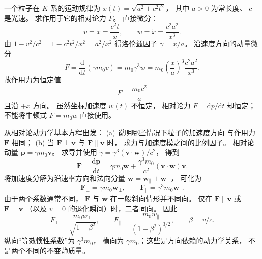 一个粒子在 $K$ 系的运动规律为
$x(t)=\sqrt{a^2+c^2t^2}$，
其中 $a>0$ 为常长度、
$c$ 是光速。
求作用于它的相对论力 $F$。
\exsolution
直接微分：
\[
v=\dot x=\frac{c^2t}{x},\qquad
w=\ddot x=\frac{c^2a^2}{x^3}.
\]
由
$1-v^2/c^2=1-c^2t^2/x^2=a^2/x^2$
得洛伦兹因子
$\gamma=x/a$。
沿速度方向的动量微分
\[
F=\frac{\mathrm d}{\mathrm dt}(\gamma m_0v)
=m_0\gamma^3 w
=m_0\left(\frac xa\right)^3
\frac{c^2a^2}{x^3}.
\]
故作用力为恒定值
\[
\boxed{F=\frac{m_0c^2}{a}}
\]
且沿 $+x$ 方向。
\excheck 虽然坐标加速度 $w(t)$ 不恒定，
相对论力 $F=\mathrm dp/\mathrm dt$ 却恒定；
不能将牛顿式 $F=m_0w$ 直接使用。

从相对论动力学基本方程出发：
(a) 说明哪些情况下粒子的加速度方向
与作用力 $\bm F$ 相同；
(b) 当 $\bm F\perp\bm v$ 与
$\bm F\parallel\bm v$ 时，
求力与加速度模之间的比例因子。
\exsolution
相对论动量
$\bm p=\gamma m_0\bm v$。
求导并使用
$\dot\gamma=\gamma^3(\bm v\cdot\bm w)/c^2$，
得到
\[
\bm F
=\frac{\mathrm d\bm p}{\mathrm dt}
=\gamma m_0\bm w+
\frac{\gamma^3m_0}{c^2}
(\bm v\cdot\bm w)\bm v.
\]
将加速度分解为沿速率方向和法向分量
$\bm w=\bm w_\parallel+\bm w_\perp$，
可化为
\[
\bm F_\perp=\gamma m_0\bm w_\perp,\qquad
\bm F_\parallel=\gamma^3m_0\bm w_\parallel.
\]
由于两个系数通常不同，
$\bm F$ 与 $\bm w$ 在一般斜向情形并不同向。
仅在 $\bm F\parallel\bm v$
或 $\bm F\perp\bm v$
（以及 $v=0$ 的退化瞬间）时，二者同向。
因此
\[
\boxed{
F_\perp=\frac{m_0w_\perp}{\sqrt{1-\beta^2}},
\qquad
F_\parallel=\frac{m_0w_\parallel}{(1-\beta^2)^{3/2}}
},\qquad \beta=v/c.
\]
\excheck 纵向“等效惯性系数”为 $\gamma^3m_0$，
横向为 $\gamma m_0$；这些是方向依赖的动力学关系，
不是两个不同的不变静质量。
